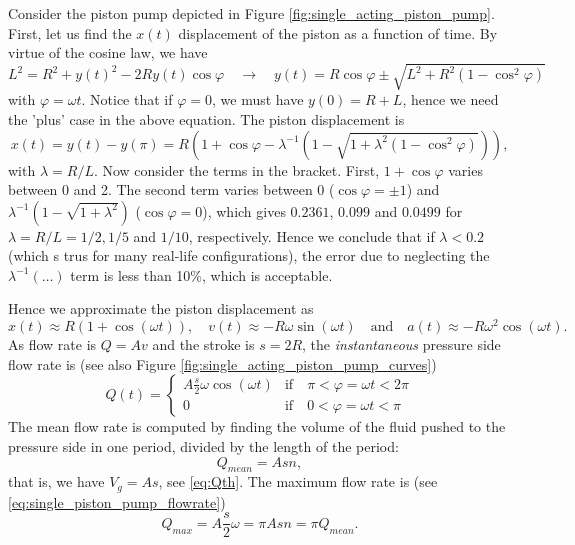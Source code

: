 Consider the piston pump depicted in Figure \ref{fig:single_acting_piston_pump}.  First, let us find the $x(t)$ displacement of the piston as a function of time. By virtue of the cosine law, we have
%
\begin{equation}
L^2=R^2+y(t)^2- 2 R y(t) \cos \varphi \quad \rightarrow \quad y(t)=R \cos \varphi \pm \sqrt{L^2+R^2\left( 1-\cos^2 \varphi\right)}
\end{equation}
%
with $\varphi=\omega t$. Notice that if $\varphi=0$, we must have $y(0)=R+L$, hence we need the 'plus' case in the above equation. The piston displacement is 
%
\begin{equation}
x(t)=y(t)-y(\pi)=R \left( 1+ \cos \varphi  - \lambda^{-1} \left(
1- \sqrt{1+\lambda^2\left( 1-\cos^2 \varphi\right)}
\right)\right),
\end{equation}
%
with $\lambda=R/L$. Now consider the terms in the bracket. First, $1+\cos \varphi$ varies between 0 and 2. The second term varies between 0 ($\cos \varphi=\pm1$) and $\lambda^{-1} \left(1- \sqrt{1+\lambda^2} \right)$ ($\cos \varphi=0$), which gives $0.2361$, $0.099$ and $0.0499$ for $\lambda=R/L=1/2,1/5$ and $1/10$, respectively. Hence we conclude that if $\lambda<0.2$ (which s trus for many real-life configurations), the error due to neglecting the $\lambda^{-1}(\dots)$ term is less than 10\%, which is acceptable.

Hence we approximate the piston displacement as
%
\begin{equation}
x(t)\approx R\left(1+\cos \left( \omega t\right) \right), \quad 
v(t)\approx-R \omega \sin \left( \omega t\right) \quad \text{and} \quad 
a(t)\approx-R \omega^2 \cos \left( \omega t\right).
\end{equation}
%
As flow rate is $Q=Av$ and the stroke is $s=2R$, the \emph{instantaneous} pressure side flow rate is (see also Figure \ref{fig:single_acting_piston_pump_curves})
%
\begin{equation}
Q(t)=
\begin{cases}
A\frac{s}{2}\omega\cos(\omega t) & \mathrm{if} \quad  \pi < \varphi=\omega t < 2 \pi \\
0 & \mathrm{if}\quad  0 < \varphi=\omega t < \pi
\end{cases}
\label{eq:single_piston_pump_flowrate}
\end{equation}
%
The mean flow rate is computed by finding the volume of the fluid pushed to the pressure side in one period, divided by the length of the period:
%
\begin{equation}
Q_{mean} = A s n, 
\end{equation}
%
that is, we have $V_g = A s$, see \eqref{eq:Qth}. The maximum flow rate is (see \eqref{eq:single_piston_pump_flowrate})
%
\begin{equation}
Q_{max} = A \frac{s}{2} \omega= \pi A s n = \pi Q_{mean}. 
\end{equation}

